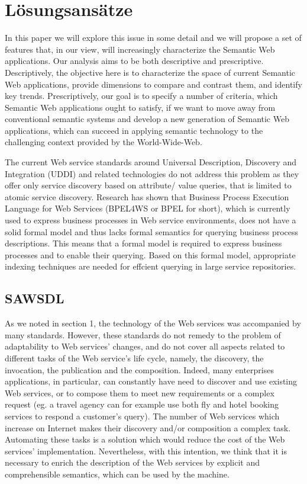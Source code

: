 \documentclass[10pt,a4paper]{article}
\begin{document}
\section{Lösungsansätze}
\label{l:loesungen}

In this paper we will explore this issue in some detail and we will propose a set of
features that, in our view, will increasingly characterize the Semantic Web
applications. Our analysis aims to be both descriptive and prescriptive. Descriptively,
the objective here is to characterize the space of current Semantic Web applications,
provide dimensions to compare and contrast them, and identify key trends.
Prescriptively, our goal is to specify a number of criteria, which Semantic Web
applications ought to satisfy, if we want to move away from conventional semantic
systems and develop a new generation of Semantic Web applications, which can
succeed in applying semantic technology to the challenging context provided by the
World-Wide-Web. \cite{ngswa}

The current Web service standards around Universal
Description, Discovery and Integration (UDDI) and related technologies do not address this
problem as they offer only service discovery based on attribute/ value queries, that is limited
to atomic service discovery. Research has shown that Business Process Execution Language
for Web Services (BPEL4WS or BPEL for short), which is currently used to express business
processes in Web service environments, does not have a solid formal model and thus lacks
formal semantics for querying business process descriptions. This means that a formal model is
required to express business processes and to enable their querying. Based on this formal model,
appropriate indexing techniques are needed for effcient querying in large service repositories. \cite{mothesis}

\subsection{SAWSDL}

As we noted in section 1, the technology of the Web
services was accompanied by many standards. However,
these standards do not remedy to the problem of adaptability
to Web services’ changes, and do not cover all aspects related
to different tasks of the Web service’s life cycle, namely, the
discovery, the invocation, the publication and the
composition. Indeed, many enterprises applications, in
particular, can constantly have need to discover and use
existing Web services, or to compose them to meet new
requirements or a complex request (eg. a travel agency can
for example use both fly and hotel booking services to
respond a customer’s query). The number of Web services
which increase on Internet makes their discovery and/or
composition a complex task. Automating these tasks is a
solution which would reduce the cost of the Web services’
implementation. Nevertheless, with this intention, we think
that it is necessary to enrich the description of the Web
services by explicit and comprehensible semantics, which can
be used by the machine. \cite{ei-sawsdl}
\end{document}
